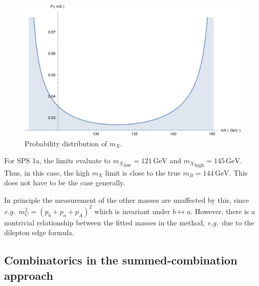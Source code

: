 \documentclass[twoside,english]{uiofysmaster}
\begin{document}
\begin{figure}[hbt]
\centering
\includegraphics[scale=0.4]{figures/appendix/mX-distribution.pdf}
\caption{Probability distribution of $m_X$.}
\label{fig:mX-dist_improvementchap}
\end{figure}
For SPS 1a, the limits evaluate to ${m_X}_\mathrm{low} = 121 \, \mathrm{GeV}$ and ${m_X}_\mathrm{high} = 145 \,\mathrm{GeV}$. Thus, in this case, the high $m_X$ limit is close to the true $m_B = 144 \,\mathrm{GeV}$. This does not have to be the case generally. 

In principle the measurement of the other masses are unaffected by this, since {\it e.g.}\ $m_C^2 = (p_b + p_a + p_A)^2$ which is invariant under $b\leftrightarrow a$. However, there is a nontrivial relationship between the fitted masses in the method, {\it e.g.}\ due to the dilepton edge formula.


\subsection{Combinatorics in the summed-combination approach}
\end{document}
